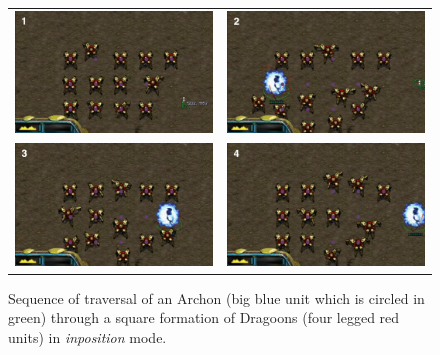 \begin{figure}[h]
\begin{center}
\begin{tabular}{cc}
\includegraphics[width=7.5cm]{images/square_traversal_1.png} & 
\includegraphics[width=7.5cm]{images/square_traversal_2.png} \\
\includegraphics[width=7.5cm]{images/square_traversal_3.png} & 
\includegraphics[width=7.5cm]{images/square_traversal_4.png} \\
\end{tabular}
\caption{Sequence of traversal of an Archon (big blue unit which is circled in green) through a square formation of Dragoons (four legged red units) in \textit{inposition} mode.}
\label{fig:squaretraversal}
\end{center}
\end{figure}


